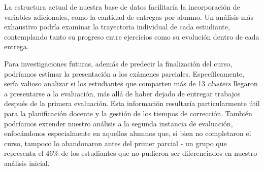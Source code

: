 \documentclass[11pt,a4paper,twoside,openany]{tesis}
\begin{document}
La estructura actual de nuestra base de datos facilitaría la incorporación de variables adicionales, como la cantidad de entregas por alumno. Un análisis más exhaustivo podría examinar la trayectoria individual de cada estudiante, contemplando tanto su progreso entre ejercicios como su evolución dentro de cada entrega.

Para investigaciones futuras, además de predecir la finalización del curso, podríamos estimar la presentación a los exámenes parciales. Específicamente, sería valioso analizar si los estudiantes que comparten más de 13 \emph{clusters} llegaron a presentarse a la evaluación, más allá de haber dejado de entregar trabajos después de la primera evaluación. Esta información resultaría particularmente útil para la planificación docente y la gestión de los tiempos de corrección. También podríamos extender nuestro análisis a la segunda instancia de evaluación, enfocándonos especialmente en aquellos alumnos que, si bien no completaron el curso, tampoco lo abandonaron antes del primer parcial - un grupo que representa el 46\% de los estudiantes que no pudieron ser diferenciados en nuestro análisis inicial.
\backmatter


\end{document}
